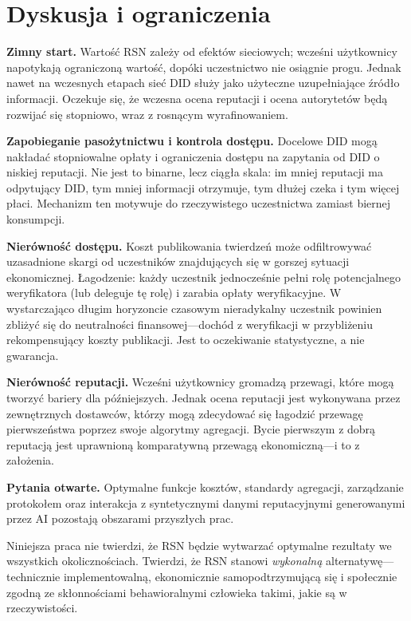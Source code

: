 \documentclass[11pt,a4paper,twocolumn]{article}
\begin{document}
\section{Dyskusja i ograniczenia}

\textbf{Zimny start.} Wartość RSN zależy od efektów sieciowych; wcześni użytkownicy napotykają ograniczoną wartość, dopóki uczestnictwo nie osiągnie progu. Jednak nawet na wczesnych etapach sieć DID służy jako użyteczne uzupełniające źródło informacji. Oczekuje się, że wczesna ocena reputacji i ocena autorytetów będą rozwijać się stopniowo, wraz z rosnącym wyrafinowaniem.

\textbf{Zapobieganie pasożytnictwu i kontrola dostępu.} Docelowe DID mogą nakładać stopniowalne opłaty i ograniczenia dostępu na zapytania od DID o niskiej reputacji. Nie jest to binarne, lecz ciągła skala: im mniej reputacji ma odpytujący DID, tym mniej informacji otrzymuje, tym dłużej czeka i tym więcej płaci. Mechanizm ten motywuje do rzeczywistego uczestnictwa zamiast biernej konsumpcji.

\textbf{Nierówność dostępu.} Koszt publikowania twierdzeń może odfiltrowywać uzasadnione skargi od uczestników znajdujących się w gorszej sytuacji ekonomicznej. Łagodzenie: każdy uczestnik jednocześnie pełni rolę potencjalnego weryfikatora (lub deleguje tę rolę) i zarabia opłaty weryfikacyjne. W wystarczająco długim horyzoncie czasowym nieradykalny uczestnik powinien zbliżyć się do neutralności finansowej---dochód z weryfikacji w przybliżeniu rekompensujący koszty publikacji. Jest to oczekiwanie statystyczne, a nie gwarancja.

\textbf{Nierówność reputacji.} Wcześni użytkownicy gromadzą przewagi, które mogą tworzyć bariery dla późniejszych. Jednak ocena reputacji jest wykonywana przez zewnętrznych dostawców, którzy mogą zdecydować się łagodzić przewagę pierwszeństwa poprzez swoje algorytmy agregacji. Bycie pierwszym z dobrą reputacją jest uprawnioną komparatywną przewagą ekonomiczną---i to z założenia.

\textbf{Pytania otwarte.} Optymalne funkcje kosztów, standardy agregacji, zarządzanie protokołem oraz interakcja z syntetycznymi danymi reputacyjnymi generowanymi przez AI pozostają obszarami przyszłych prac.

Niniejsza praca nie twierdzi, że RSN będzie wytwarzać optymalne rezultaty we wszystkich okolicznościach. Twierdzi, że RSN stanowi \emph{wykonalną} alternatywę---technicznie implementowalną, ekonomicznie samopodtrzymującą się i społecznie zgodną ze skłonnościami behawioralnymi człowieka takimi, jakie są w rzeczywistości.
\end{document}
